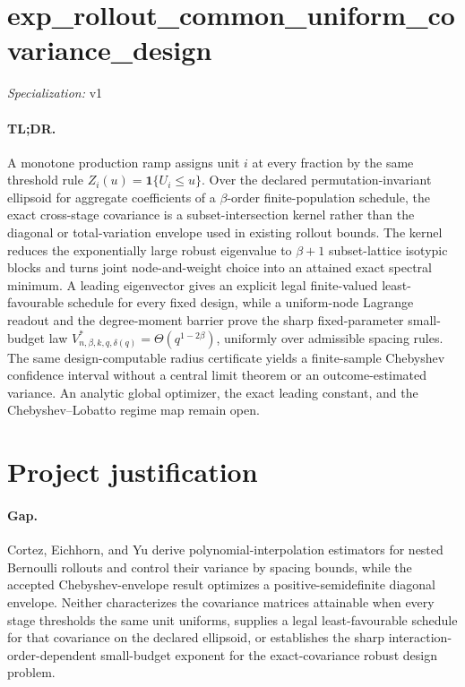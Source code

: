 \documentclass{article}
\begin{document}
\sloppy

\section*{exp\_\allowbreak{}rollout\_\allowbreak{}common\_\allowbreak{}uniform\_\allowbreak{}covariance\_\allowbreak{}design}

\noindent\textit{Specialization:} v1\par

\paragraph{TL;DR.} A monotone production ramp assigns unit \(i\) at every fraction by the same threshold rule \(Z_i(u)=\mathbf 1\{U_i\le u\}\). Over the declared permutation-invariant ellipsoid for aggregate coefficients of a \(\beta\)-order finite-population schedule, the exact cross-stage covariance is a subset-intersection kernel rather than the diagonal or total-variation envelope used in existing rollout bounds. The kernel reduces the exponentially large robust eigenvalue to \(\beta+1\) subset-lattice isotypic blocks and turns joint node-and-weight choice into an attained exact spectral minimum. A leading eigenvector gives an explicit legal finite-valued least-favourable schedule for every fixed design, while a uniform-node Lagrange readout and the degree-moment barrier prove the sharp fixed-parameter small-budget law \(V^*_{n,\beta,k,q,\delta(q)}=\Theta(q^{1-2\beta})\), uniformly over admissible spacing rules. The same design-computable radius certificate yields a finite-sample Chebyshev confidence interval without a central limit theorem or an outcome-estimated variance. An analytic global optimizer, the exact leading constant, and the Chebyshev--Lobatto regime map remain open.

\section{Project justification}

\paragraph{Gap.} Cortez, Eichhorn, and Yu derive polynomial-interpolation estimators for nested Bernoulli rollouts and control their variance by spacing bounds, while the accepted Chebyshev-envelope result optimizes a positive-semidefinite diagonal envelope. Neither characterizes the covariance matrices attainable when every stage thresholds the same unit uniforms, supplies a legal least-favourable schedule for that covariance on the declared ellipsoid, or establishes the sharp interaction-order-dependent small-budget exponent for the exact-covariance robust design problem.
\end{document}
